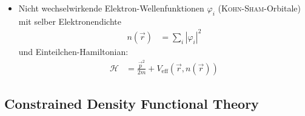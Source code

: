 \begin{frame}
\begin{itemize}
\item Nicht wechselwirkende Elektron-Wellenfunktionen $\varphi_i$  (\textsc{Kohn-Sham}-Orbitale) mit selber Elektronendichte
\begin{align*}
n(\vec{r}) &= \sum_i \left|\varphi_i\right|^2
\end{align*}
und Einteilchen-Hamiltonian:
\begin{align*}
\mathcal{H} &= \frac{\vec{p}^2}{2m} + V_\text{eff}(\vec{r}, n(\vec{r}))
\end{align*}
\end{itemize}

\end{frame}


\subsection{Constrained Density Functional Theory}
\begin{frame}{}
\end{frame}